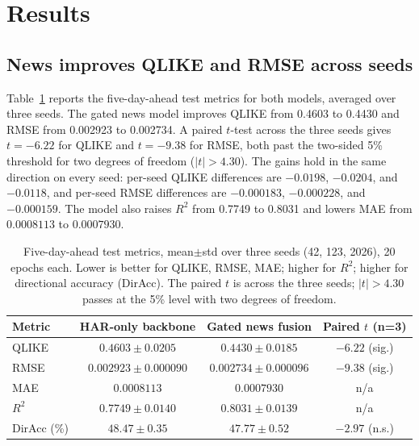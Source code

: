 \documentclass[runningheads]{llncs}
\newcommand{\qlikeHAR}{0.4603}
\newcommand{\qlikeNews}{0.4430}
\newcommand{\qliketstat}{-6.22}
\newcommand{\rmseHAR}{0.002923}
\newcommand{\rmseNews}{0.002734}
\newcommand{\rmsetstat}{-9.38}
\newcommand{\rsqHAR}{0.7749}
\newcommand{\rsqNews}{0.8031}
\begin{document}
\section{Results}
\label{sec:results}

\subsection{News improves QLIKE and RMSE across seeds}
Table~\ref{tab:headline} reports the five-day-ahead test metrics for both models, averaged over
three seeds. The gated news model improves QLIKE from \qlikeHAR{} to \qlikeNews{} and RMSE from
\rmseHAR{} to \rmseNews{}. A paired $t$-test across the three seeds gives $t=\qliketstat$ for QLIKE
and $t=\rmsetstat$ for RMSE, both past the two-sided 5\% threshold for two degrees of freedom
($|t|>4.30$). The gains hold in the same direction on every seed: per-seed QLIKE differences are
$-0.0198$, $-0.0204$, and $-0.0118$, and per-seed RMSE differences are $-0.000183$, $-0.000228$,
and $-0.000159$. The model also raises $R^2$ from \rsqHAR{} to \rsqNews{} and lowers MAE from
$0.0008113$ to $0.0007930$.

\begin{table}[t]
\caption{Five-day-ahead test metrics, mean$\pm$std over three seeds (42, 123, 2026), 20 epochs
each. Lower is better for QLIKE, RMSE, MAE; higher for $R^2$; higher for directional accuracy
(DirAcc). The paired $t$ is across the three seeds; $|t|>4.30$ passes at the 5\% level with two
degrees of freedom.}
\label{tab:headline}
\centering
\begin{tabular}{lccc}
\toprule
Metric & HAR-only backbone & Gated news fusion & Paired $t$ (n=3) \\
\midrule
QLIKE            & $0.4603\pm0.0205$   & $\mathbf{0.4430\pm0.0185}$   & $-6.22$ (sig.) \\
RMSE             & $0.002923\pm0.000090$ & $\mathbf{0.002734\pm0.000096}$ & $-9.38$ (sig.) \\
MAE              & $0.0008113$         & $\mathbf{0.0007930}$         & n/a \\
$R^2$            & $0.7749\pm0.0140$   & $\mathbf{0.8031\pm0.0139}$   & n/a \\
DirAcc (\%)      & $\mathbf{48.47\pm0.35}$ & $47.77\pm0.52$           & $-2.97$ (n.s.) \\
\bottomrule
\end{tabular}
\end{table}
\end{document}
